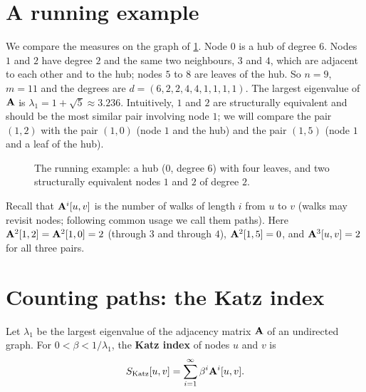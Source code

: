 \begin{notechapter}
\section{A running example}\label{node-similarity:sec:running}

We compare the measures on the graph of \cref{node-similarity:fig:running}. Node $0$ is a hub of degree $6$. Nodes $1$ and $2$ have degree $2$ and the same two neighbours, $3$ and $4$, which are adjacent to each other and to the hub; nodes $5$ to $8$ are leaves of the hub. So $n = 9$, $m = 11$ and the degrees are $d = (6, 2, 2, 4, 4, 1, 1, 1, 1)$. The largest eigenvalue of $\mathbf{A}$ is $\lambda_1 = 1 + \sqrt5 \approx 3.236$. Intuitively, $1$ and $2$ are structurally equivalent and should be the most similar pair involving node $1$; we will compare the pair $(1, 2)$ with the pair $(1, 0)$ (node $1$ and the hub) and the pair $(1, 5)$ (node $1$ and a leaf of the hub).

\begin{figure}[H]
\centering
{}
\caption{The running example: a hub ($0$, degree $6$) with four leaves, and two structurally equivalent nodes $1$ and $2$ of degree $2$.}
\label{node-similarity:fig:running}
\end{figure}

Recall that $\mathbf{A}^i[u,v]$ is the number of walks of length $i$ from $u$ to $v$ (walks may revisit nodes; following common usage we call them paths). Here $\mathbf{A}^2[1,2] = \mathbf{A}^2[1,0] = 2$ (through $3$ and through $4$), $\mathbf{A}^2[1,5] = 0$, and $\mathbf{A}^3[u,v] = 2$ for all three pairs.

\section{Counting paths: the Katz index}

\begin{definition}\label{node-similarity:def:katz}
Let $\lambda_1$ be the largest eigenvalue of the adjacency matrix $\mathbf{A}$ of an undirected graph. For $0 < \beta < 1/\lambda_1$, the \textbf{Katz index} of nodes $u$ and $v$ is
\begin{equation}
S_{\text{Katz}}[u,v] = \sum_{i=1}^{\infty} \beta^i \mathbf{A}^i[u,v].
\label{node-similarity:eq:katz}
\end{equation}
\end{definition}


\end{notechapter}
